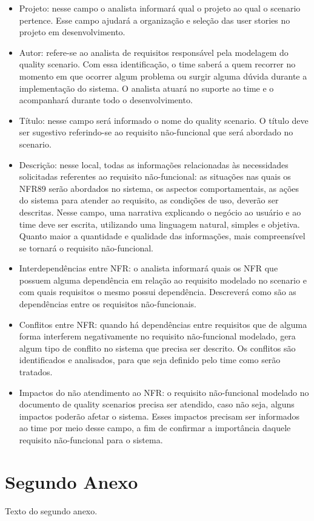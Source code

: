 \begin{anexosenv}
\begin{citacao}
\begin{itemize}
				\item Projeto: nesse campo o analista informará qual o projeto ao qual o scenario pertence. Esse campo ajudará a organização e seleção das user stories no projeto em desenvolvimento.
				\item Autor: refere-se ao analista de requisitos responsável pela modelagem do quality scenario. Com essa identificação, o time saberá a quem recorrer no momento em que ocorrer algum problema ou surgir alguma dúvida durante a implementação do sistema. O analista atuará no suporte ao time e o acompanhará durante todo o desenvolvimento.
				\item Título: nesse campo será informado o nome do quality scenario. O título deve ser sugestivo referindo-se ao requisito não-funcional que será abordado no scenario.
				\item Descrição: nesse local, todas as informações relacionadas às necessidades solicitadas referentes ao requisito não-funcional: as situações nas quais os NFR89 serão abordados no sistema, os aspectos comportamentais, as ações do sistema para atender ao requisito, as condições de uso, deverão ser descritas. Nesse campo, uma narrativa explicando o negócio ao usuário e ao time deve ser escrita, utilizando uma linguagem natural, simples e objetiva. Quanto maior a quantidade e qualidade das informações, mais compreensível se tornará o requisito não-funcional.
				\item Interdependências entre NFR: o analista informará quais os NFR que possuem alguma dependência em relação ao requisito modelado no scenario e com quais requisitos o mesmo possui dependência. Descreverá como são as dependências entre os requisitos não-funcionais.
				\item Conflitos entre NFR: quando há dependências entre requisitos que de alguma forma interferem negativamente no requisito não-funcional modelado, gera algum tipo de conflito no sistema que precisa ser descrito. Os conflitos são identificados e analisados, para que seja definido pelo time como serão tratados.
				\item Impactos do não atendimento ao NFR: o requisito não-funcional modelado no documento de quality scenarios precisa ser atendido, caso não seja, alguns impactos poderão afetar o sistema. Esses impactos precisam ser informados ao time por meio desse campo, a fim de confirmar a importância daquele requisito
				não-funcional para o sistema.

			\end{itemize}

		\end{citacao}

\chapter{Segundo Anexo}

Texto do segundo anexo.

\end{anexosenv}
